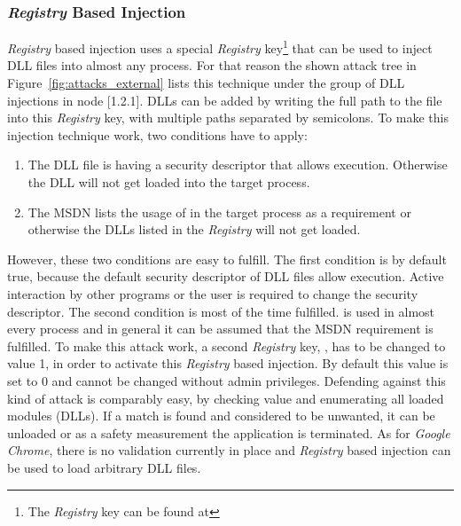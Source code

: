 \subsubsection{\emph{Registry} Based Injection}
\emph{Registry} based injection uses a special \emph{Registry} key\footnote{The \emph{Registry} key can be found at } that can be used to inject \gls{DLL} files into almost any process. For that reason the shown attack tree in Figure~\ref{fig:attacks_external} lists this technique under the group of \gls{DLL} injections in node [1.2.1]. \glspl{DLL} can be added by writing the full path to the file into this \emph{Registry} key, with multiple paths separated by semicolons. To make this injection technique work, two conditions have to apply:
\begin{enumerate}
\item The \gls{DLL} file is having a security descriptor that allows execution. Otherwise the \gls{DLL} will not get loaded into the target process.
\item The \gls{MSDN} \cite{msdn_appinitdlls} lists the usage of  in the target process as a requirement or otherwise the \glspl{DLL} listed in the \emph{Registry} will not get loaded.
\end{enumerate}
However, these two conditions are easy to fulfill. The first condition is by default true, because the default security descriptor of \gls{DLL} files allow execution. Active interaction by other programs or the user is required to change the security descriptor. The second condition is most of the time fulfilled.  is used in almost every process and in general it can be assumed that the \gls{MSDN} requirement is fulfilled. To make this attack work, a second \emph{Registry} key, , has to be changed to value 1, in order to activate this \emph{Registry} based injection. By default this value is set to 0 and cannot be changed without admin privileges.
Defending against this kind of attack is comparably easy, by checking  value and enumerating all loaded modules (\glspl{DLL}). If a match is found and considered to be unwanted, it can be unloaded or as a safety measurement the application is terminated. As for \emph{Google Chrome}, there is no validation currently in place and \emph{Registry} based injection can be used to load arbitrary \gls{DLL} files.